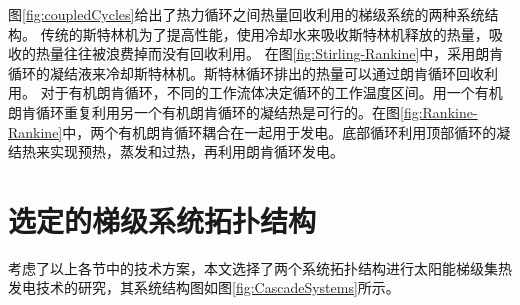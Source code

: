 图\ref{fig:coupledCycles}给出了热力循环之间热量回收利用的梯级系统的两种系统结构。
传统的斯特林机为了提高性能，使用冷却水来吸收斯特林机释放的热量，吸收的热量往往被浪费掉而没有回收利用。
在图\ref{fig:Stirling-Rankine}中，采用朗肯循环的凝结液来冷却斯特林机。斯特林循环排出的热量可以通过朗肯循环回收利用。
对于有机朗肯循环，不同的工作流体决定循环的工作温度区间。用一个有机朗肯循环重复利用另一个有机朗肯循环的凝结热是可行的。在图\ref{fig:Rankine-Rankine}中，两个有机朗肯循环耦合在一起用于发电。底部循环利用顶部循环的凝结热来实现预热，蒸发和过热，再利用朗肯循环发电。

\section{选定的梯级系统拓扑结构}
\label{sec:sst}

考虑了以上各节中的技术方案，本文选择了两个系统拓扑结构进行太阳能梯级集热发电技术的研究，其系统结构图如图\ref{fig:CascadeSystems}所示。

